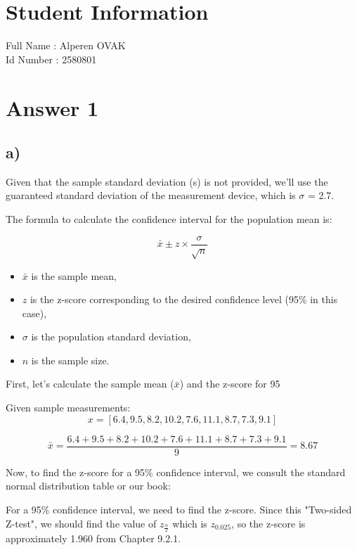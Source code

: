 \documentclass[12pt]{article}
\begin{document}
\section*{Student Information } 
Full Name :  Alperen OVAK \\
Id Number :  2580801\\

\section*{Answer 1}

\subsection*{a)} 

Given that the sample standard deviation (s) is not provided, we'll use the guaranteed standard deviation of the measurement device, which is $\sigma$ = 2.7.

The formula to calculate the confidence interval for the population mean is:

\[ \bar{x} \pm z \times \frac{\sigma}{\sqrt{n}} \]

\begin{itemize}
    \item $\bar{x}$ is the sample mean,
    \item $z$ is the z-score corresponding to the desired confidence level (95\% in this case),
    \item $\sigma$ is the population standard deviation,
    \item $n$ is the sample size.
\end{itemize}

First, let's calculate the sample mean (\(\bar{x}\)) and the z-score for 95%

Given sample measurements:
\[ x = [6.4, 9.5, 8.2, 10.2, 7.6, 11.1, 8.7, 7.3, 9.1] \]

\[ \bar{x} = \frac{6.4 + 9.5 + 8.2 + 10.2 + 7.6 + 11.1 + 8.7 + 7.3 + 9.1}{9} = 8.67 \]

Now, to find the z-score for a 95\% confidence interval, we consult the standard normal distribution table or our book:

For a 95\% confidence interval, we need to find the z-score. Since this "Two-sided Z-test", we should find the value of $z_{\frac{\alpha}{2}}$ which is $z_{0.025}$, so the z-score is approximately 1.960 from Chapter 9.2.1.
\end{document}

